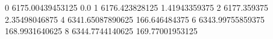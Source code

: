 0 6175.00439453125 0.0
1 6176.423828125 1.41943359375
2 6177.359375 2.35498046875
4 6341.65087890625 166.646484375
6 6343.99755859375 168.9931640625
8 6344.7744140625 169.77001953125
